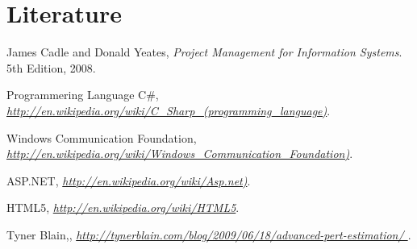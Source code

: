 \section{Literature}
\begin{thebibliography}{9}

  James Cadle and Donald Yeates,
  \emph{Project Management for Information Systems}.
  5th Edition,
  2008.

	Programmering Language C\#, 
  \emph{\url{http://en.wikipedia.org/wiki/C_Sharp_(programming_language)}}.
  
	Windows Communication Foundation, 
  \emph{\url{http://en.wikipedia.org/wiki/Windows_Communication_Foundation)}}.
  
	ASP.NET, 
  \emph{\url{http://en.wikipedia.org/wiki/Asp.net)}}.
  
	HTML5, 
  \emph{\url{http://en.wikipedia.org/wiki/HTML5}}.
  
	Tyner Blain,, 
  \emph{\url{http://tynerblain.com/blog/2009/06/18/advanced-pert-estimation/
}}.
\end{thebibliography}